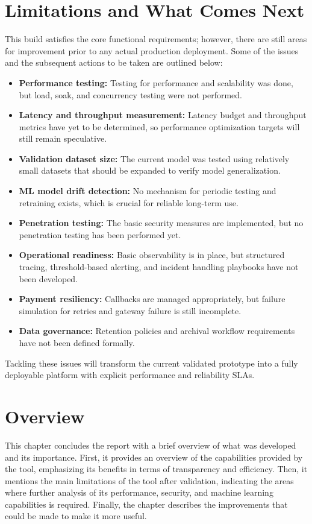\documentclass{thesis-library}
\begin{document}
\section{Limitations and What Comes Next}
This build satisfies the core functional requirements; however, there are still areas for improvement prior to any actual production deployment. Some of the issues and the subsequent actions to be taken are outlined below:
\begin{itemize}
    \item \textbf{Performance testing:} Testing for performance and scalability was done, but load, soak, and concurrency testing were not performed.
    \item \textbf{Latency and throughput measurement:} Latency budget and throughput metrics have yet to be determined, so performance optimization targets will still remain speculative.
    \item \textbf{Validation dataset size:} The current model was tested using relatively small datasets that should be expanded to verify model generalization.
    \item \textbf{ML model drift detection:} No mechanism for periodic testing and retraining exists, which is crucial for reliable long-term use.
    \item \textbf{Penetration testing:} The basic security measures are implemented, but no penetration testing has been performed yet.
    \item \textbf{Operational readiness:} Basic observability is in place, but structured tracing, threshold-based alerting, and incident handling playbooks have not been developed.
    \item \textbf{Payment resiliency:} Callbacks are managed appropriately, but failure simulation for retries and gateway failure is still incomplete.
    \item \textbf{Data governance:} Retention policies and archival workflow requirements have not been defined formally.
\end{itemize}
Tackling these issues will transform the current validated prototype into a fully deployable platform with explicit performance and reliability SLAs.


\section{Overview}
This chapter concludes the report with a brief overview of what was developed and its importance. First, it provides an overview of the capabilities provided by the tool, emphasizing its benefits in terms of transparency and efficiency. Then, it mentions the main limitations of the tool after validation, indicating the areas where further analysis of its performance, security, and machine learning capabilities is required. Finally, the chapter describes the improvements that could be made to make it more useful.
\end{document}

